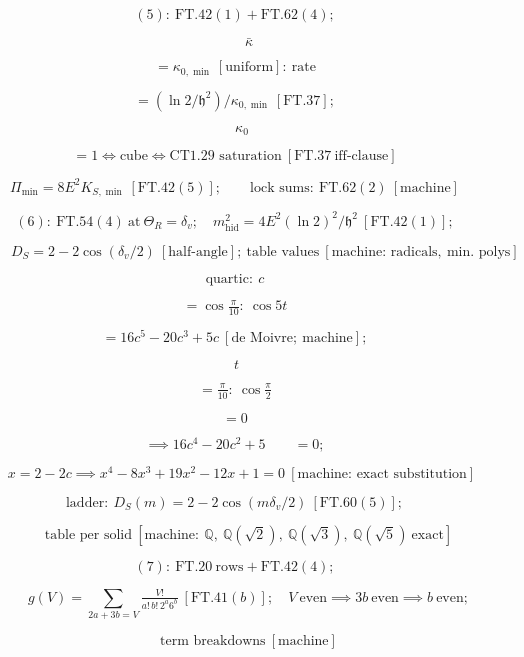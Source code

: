 \begin{theorem}
\[
(5):\ \mathrm{FT.42}(1)+\mathrm{FT.62}(4);
\]

\[
\qquad \bar\kappa
\]

\[
= \kappa_{0,\min}\ [\text{uniform}]:\ \text{rate}
\]

\[
= (\ln2/\mathfrak h^2)/\kappa_{0,\min}\ [\mathrm{FT.37}];
\]

\[
\quad\kappa_0
\]

\[
= 1\iff\text{cube}\iff\text{CT1.29 saturation}\ [\mathrm{FT.37}\ \text{iff-clause}]
\]

\[
\Pi_{\min}=8E^2K_{S,\min}\ [\mathrm{FT.42}(5)];\qquad\text{lock sums}:\ \mathrm{FT.62}(2)\ [\text{machine}]
\]

\[
(6):\ \mathrm{FT.54}(4)\ \text{at}\ \Theta_R=\delta_v;\quad m^2_{\mathrm{hid}}=4E^2(\ln2)^2/\mathfrak h^2\ [\mathrm{FT.42}(1)];
\]

\[
\qquad D_S=2-2\cos(\delta_v/2)\ [\text{half-angle}];\ \text{table values}\ [\text{machine: radicals},\ \text{min. polys}]
\]

\[
\text{quartic}:\ c
\]

\[
= \cos\tfrac\pi{10}:\ \cos5t
\]

\[
= 16c^5-20c^3+5c\ [\text{de Moivre};\ \text{machine}];
\]

\[
\ t
\]

\[
= \tfrac\pi{10}:\ \cos\tfrac\pi2
\]

\[
= 0
\]

\[
\implies 16c^4-20c^2+5\qquad = 0;
\]

\[
\quad x=2-2c\implies x^4-8x^3+19x^2-12x+1=0\ [\text{machine: exact substitution}]
\]

\[
\text{ladder}:\ D_S(m)=2-2\cos(m\delta_v/2)\ [\mathrm{FT.60}(5)];
\]

\[
\qquad \text{table per solid}\ [\text{machine}:\ \mathbb Q,\ \mathbb Q(\sqrt2),\ \mathbb Q(\sqrt3),\ \mathbb Q(\sqrt5)\ \text{exact}]
\]

\[
(7):\ \mathrm{FT.20}\ \text{rows}+\mathrm{FT.42}(4);
\]

\[
\qquad g(V)=\!\!\sum_{2a+3b=V}\!\!\tfrac{V!}{a!\,b!\,2^a6^b}\ [\mathrm{FT.41}(b)];\quad V\ \text{even}\implies3b\ \text{even}\implies b\ \text{even};
\]

\[
\qquad \text{term breakdowns}\ [\text{machine}]
\]


\end{theorem}
